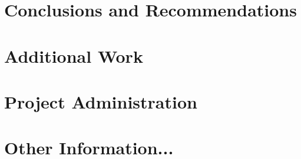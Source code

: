 \documentclass{article}
\begin{document}
\section{Conclusions and Recommendations}


\newpage



\appendix

\newpage

\section{Additional Work}


\newpage
\section{Project Administration}


\section{Other Information...}
	
\end{document}
